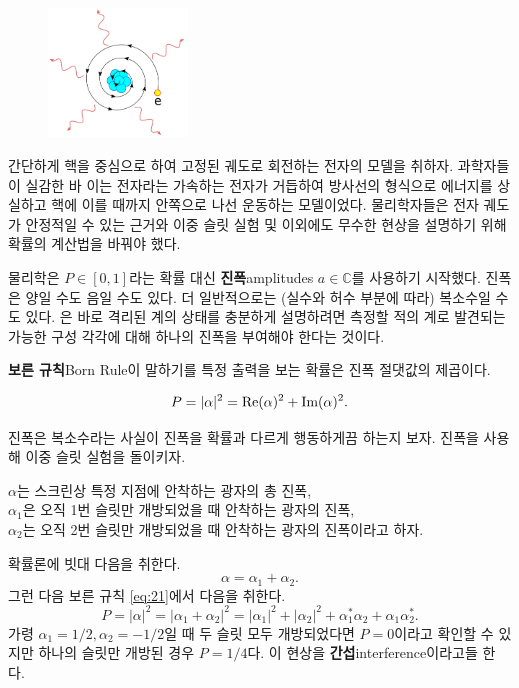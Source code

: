 \documentclass[a4paper,chapter,atbegshi,hidelinks]{oblivoir}
\begin{document}
\begin{figure}
    \centering
    \includegraphics[width=0.33\textwidth]{iqis1_008}
\end{figure}

간단하게 핵을 중심으로 하여 고정된 궤도로 회전하는 전자의 모델을 취하자.
과학자들이 실감한 바 이는 전자라는 가속하는 전자가 거듭하여 방사선의
형식으로 에너지를 상실하고 핵에 이를 때까지 안쪽으로 나선 운동하는 모델이었다.
물리학자들은 전자 궤도가 안정적일 수 있는 근거와 이중 슬릿 실험 및 이외에도
무수한 현상을 설명하기 위해 확률의 계산법을 바꿔야 했다. 

물리학은 $P\in[0,1]$라는 확률 대신 \textbf{진폭}{\footnotesize amplitudes}
$a\in\mathbb{C}$를 사용하기 시작했다. 진폭은 양일 수도 음일 수도 있다. 더
일반적으로는 (실수와 허수 부분에 따라) 복소수일 수도 있다. 은 바로 격리된 계의 상태를 충분하게 설명하려면 측정할 적의 계로
발견되는 가능한 구성 각각에 대해 하나의 진폭을 부여해야 한다는 것이다.

\textbf{보른 규칙}{\footnotesize Born Rule}이 말하기를 특정 출력을 보는 확률은
진폭 절댓값의 제곱이다.

\begin{equation}{\label{eq:21}}
  P = |\alpha|^2=\textrm{Re}(\alpha)^2+\textrm{Im}(\alpha)^2.
\end{equation}

진폭은 복소수라는 사실이 진폭을 확률과 다르게 행동하게끔 하는지 보자. 진폭을
사용해 이중 슬릿 실험을 돌이키자.

\hfill
\hfill\parbox[t]{12cm}{
  $\alpha$는 스크린상 특정 지점에 안착하는 광자의 총 진폭,\\
  $\alpha_1$은 오직 1번 슬릿만 개방되었을 때 안착하는 광자의 진폭,\\
  $\alpha_2$는 오직 2번 슬릿만 개방되었을 때 안착하는 광자의 진폭이라고 하자.
}

\hfill\break
확률론에 빗대 다음을 취한다.
\begin{equation}
  \alpha = \alpha_1+\alpha_2.
\end{equation}
그런 다음 보른 규칙 \ref{eq:21}에서 다음을 취한다.
\begin{equation}
  P = |\alpha|^2=|\alpha_1+\alpha_2|^2=|\alpha_1|^2+|\alpha_2|^2+
  \alpha_1^*\alpha_2+\alpha_1\alpha_2^*.
\end{equation}
가령 $\alpha_1=1/2, \alpha_2=-1/2$일 때 두 슬릿 모두 개방되었다면 $P=0$이라고
확인할 수 있지만 하나의 슬릿만 개방된 경우 $P=1/4$다. 이 현상을
\textbf{간섭}{\footnotesize interference}이라고들 한다.
\end{document}
